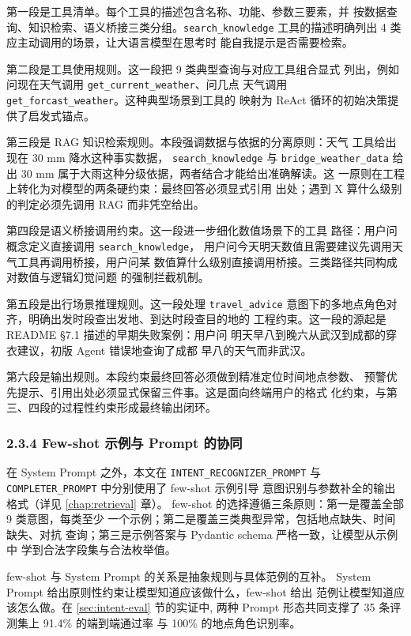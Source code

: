 \documentclass[a4paper]{article}
\theoremstyle{definition}
\theoremstyle{plain}
\theoremstyle{remark}
\newcommand{\bk}{\discretionary{}{}{}}
\begin{document}
第一段是工具清单。每个工具的描述包含名称、功能、参数三要素，并
按数据查询、知识检索、语义桥接三类分组。\texttt{search\_\bk{}knowledge}
工具的描述明确列出 4 类应主动调用的场景，让大语言模型在思考时
能自我提示是否需要检索。

第二段是工具使用规则。这一段把 9 类典型查询与对应工具组合显式
列出，例如问现在天气调用 \texttt{get\_\bk{}current\_\bk{}weather}、问几点
天气调用 \texttt{get\_\bk{}forcast\_\bk{}weather}。这种典型场景到工具的
映射为 ReAct 循环的初始决策提供了启发式锚点。

第三段是 RAG 知识检索规则。本段强调数据与依据的分离原则：天气
工具给出现在 30 mm 降水这种事实数据，
\texttt{search\_\bk{}knowledge} 与 \texttt{bridge\_\bk{}weather\_\bk{}data}
给出 30 mm 属于大雨这种分级依据，两者结合才能给出准确解读。这
一原则在工程上转化为对模型的两条硬约束：最终回答必须显式引用
出处；遇到 X 算什么级别的判定必须先调用 RAG 而非凭空给出。

第四段是语义桥接调用约束。这一段进一步细化数值场景下的工具
路径：用户问概念定义直接调用 \texttt{search\_\bk{}knowledge}，
用户问今天明天数值且需要建议先调用天气工具再调用桥接，用户问某
数值算什么级别直接调用桥接。三类路径共同构成对数值与逻辑幻觉问题
的强制拦截机制。

第五段是出行场景推理规则。这一段处理 \texttt{travel\_\bk{}advice}
意图下的多地点角色对齐，明确出发时段查出发地、到达时段查目的地的
工程约束。这一段的源起是 README §7.1 描述的早期失败案例：用户问
明天早八到晚六从武汉到成都的穿衣建议，初版 Agent 错误地查询了成都
早八的天气而非武汉。

第六段是输出规则。本段约束最终回答必须做到精准定位时间地点参数、
预警优先提示、引用出处必须显式保留三件事。这是面向终端用户的格式
化约束，与第三、四段的过程性约束形成最终输出闭环。

\subsubsection*{2.3.4 \quad Few-shot 示例与 Prompt 的协同}

在 System Prompt 之外，本文在 \texttt{INTENT\_\bk{}RECOGNIZER\_\bk{}PROMPT}
与 \texttt{COMPLETER\_\bk{}PROMPT} 中分别使用了 few-shot 示例引导
意图识别与参数补全的输出格式（详见 \ref{chap:retrieval} 章）。
few-shot 的选择遵循三条原则：第一是覆盖全部 9 类意图，每类至少
一个示例；第二是覆盖三类典型异常，包括地点缺失、时间缺失、对抗
查询；第三是示例答案与 Pydantic schema 严格一致，让模型从示例中
学到合法字段集与合法枚举值。

few-shot 与 System Prompt 的关系是抽象规则与具体范例的互补。
System Prompt 给出原则性约束让模型知道应该做什么，few-shot 给出
范例让模型知道应该怎么做。在 \ref{sec:intent-eval} 节的实证中,
两种 Prompt 形态共同支撑了 35 条评测集上 91.4\% 的端到端通过率
与 100\% 的地点角色识别率。
\end{document}
